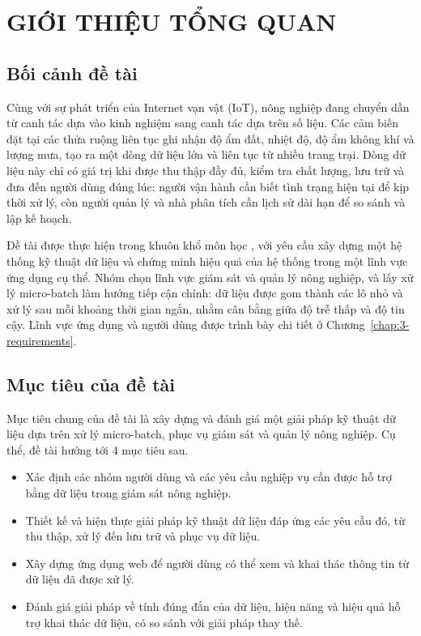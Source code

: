 \chapter{GIỚI THIỆU TỔNG QUAN}
\label{chap:1-intro}

\section{Bối cảnh đề tài}
\label{sec:1-context}

Cùng với sự phát triển của Internet vạn vật (IoT), nông nghiệp đang chuyển dần từ canh tác dựa vào kinh nghiệm sang canh tác dựa trên số liệu. Các cảm biến đặt tại các thửa ruộng liên tục ghi nhận độ ẩm đất, nhiệt độ, độ ẩm không khí và lượng mưa, tạo ra một dòng dữ liệu lớn và liên tục từ nhiều trang trại. Dòng dữ liệu này chỉ có giá trị khi được thu thập đầy đủ, kiểm tra chất lượng, lưu trữ và đưa đến người dùng đúng lúc: người vận hành cần biết tình trạng hiện tại để kịp thời xử lý, còn người quản lý và nhà phân tích cần lịch sử dài hạn để so sánh và lập kế hoạch.

Đề tài được thực hiện trong khuôn khổ môn học \tenmonhoc, với yêu cầu xây dựng một hệ thống kỹ thuật dữ liệu và chứng minh hiệu quả của hệ thống trong một lĩnh vực ứng dụng cụ thể. Nhóm chọn lĩnh vực giám sát và quản lý nông nghiệp, và lấy xử lý micro-batch làm hướng tiếp cận chính: dữ liệu được gom thành các lô nhỏ và xử lý sau mỗi khoảng thời gian ngắn, nhằm cân bằng giữa độ trễ thấp và độ tin cậy. Lĩnh vực ứng dụng và người dùng được trình bày chi tiết ở Chương~\ref{chap:3-requirements}.

\section{Mục tiêu của đề tài}
\label{sec:1-objectives}

Mục tiêu chung của đề tài là xây dựng và đánh giá một giải pháp kỹ thuật dữ liệu dựa trên xử lý micro-batch, phục vụ giám sát và quản lý nông nghiệp. Cụ thể, đề tài hướng tới 4 mục tiêu sau.

\begin{itemize}
  \item Xác định các nhóm người dùng và các yêu cầu nghiệp vụ cần được hỗ trợ bằng dữ liệu trong giám sát nông nghiệp.
  \item Thiết kế và hiện thực giải pháp kỹ thuật dữ liệu đáp ứng các yêu cầu đó, từ thu thập, xử lý đến lưu trữ và phục vụ dữ liệu.
  \item Xây dựng ứng dụng web để người dùng có thể xem và khai thác thông tin từ dữ liệu đã được xử lý.
  \item Đánh giá giải pháp về tính đúng đắn của dữ liệu, hiệu năng và hiệu quả hỗ trợ khai thác dữ liệu, có so sánh với giải pháp thay thế.
\end{itemize}

